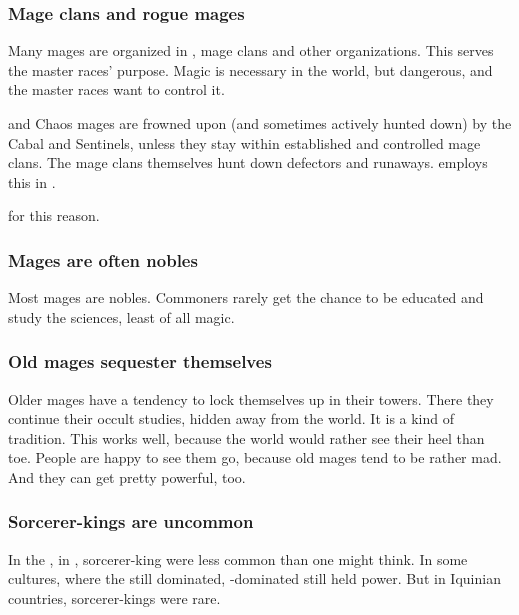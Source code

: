 \subsubsection{Mage clans and rogue mages}
Many mages are organized in \ishroth, mage clans and other organizations. This serves the master races' purpose. Magic is necessary in the world, but dangerous, and the master races want to control it. 

\Nieur{} and Chaos mages are frowned upon (and sometimes actively hunted down) by the Cabal and Sentinels, unless they stay within established and controlled mage clans. The mage clans themselves hunt down defectors and runaways.  employs this in .

 for this reason. 




\subsubsection{Mages are often nobles}
Most mages are nobles. 
Commoners rarely get the chance to be educated and study the sciences, least of all magic. 





\subsubsection{Old mages sequester themselves}
Older mages have a tendency to lock themselves up in their towers.
There they continue their occult studies, hidden away from the world. 
It is a kind of tradition. 
This works well, because the world would rather see their heel than toe. 
People are happy to see them go, because old mages tend to be rather mad. 
And they can get pretty powerful, too. 





\subsubsection{Sorcerer-kings are uncommon}
In the , in \Azmith, sorcerer-king were less common than one might think. 
In some \scathaese cultures, where the  still dominated, \rethyax-dominated  still held power. 
But in Iquinian countries, sorcerer-kings were rare. 

